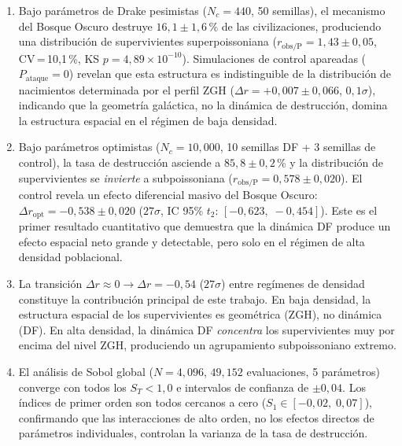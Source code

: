 \documentclass[11pt,a4paper,onecolumn]{article}
\begin{document}
\begin{enumerate}
  \item Bajo parámetros de Drake pesimistas ($N_c = 440$, 50 semillas),
        el mecanismo del Bosque Oscuro destruye $16{,}1 \pm 1{,}6$\,\%
        de las civilizaciones, produciendo una distribución de
        supervivientes superpoissoniana
        ($r_\text{obs/P} = 1{,}43 \pm 0{,}05$, CV\,=\,10{,}1\,\%,
        KS $p = 4{,}89\times10^{-10}$).
        Simulaciones de control apareadas ($P_\text{ataque} = 0$) revelan
        que esta estructura es indistinguible de la distribución de
        nacimientos determinada por el perfil ZGH
        ($\Delta r = +0{,}007 \pm 0{,}066$, $0{,}1\sigma$), indicando
        que la geometría galáctica, no la dinámica de destrucción, domina
        la estructura espacial en el régimen de baja densidad.

  \item Bajo parámetros optimistas ($N_c = 10{,}000$, 10 semillas DF +
        3 semillas de control), la tasa de destrucción asciende a
        $85{,}8 \pm 0{,}2$\,\% y la distribución de supervivientes se
        \emph{invierte} a subpoissoniana
        ($r_\text{obs/P} = 0{,}578 \pm 0{,}020$).
        El control revela un efecto diferencial masivo del Bosque Oscuro:
        $\Delta r_\text{opt} = -0{,}538 \pm 0{,}020$ ($27\sigma$,
        IC 95\% $t_2$: $[-0{,}623,\; -0{,}454]$).
        Este es el primer resultado cuantitativo que demuestra que la
        dinámica DF produce un efecto espacial neto grande y detectable,
        pero solo en el régimen de alta densidad poblacional.

  \item La transición $\Delta r \approx 0 \to \Delta r = -0{,}54$
        ($27\sigma$) entre regímenes de densidad constituye la
        contribución principal de este trabajo.
        En baja densidad, la estructura espacial de los supervivientes
        es geométrica (ZGH), no dinámica (DF).
        En alta densidad, la dinámica DF \emph{concentra} los
        supervivientes muy por encima del nivel ZGH, produciendo un
        agrupamiento subpoissoniano extremo.

  \item El análisis de Sobol global ($N = 4{,}096$, $49{,}152$
        evaluaciones, 5 parámetros) converge con todos los
        $S_T < 1{,}0$ e intervalos de confianza de $\pm 0{,}04$.
        Los índices de primer orden son todos cercanos a cero
        ($S_1 \in [-0{,}02,\;0{,}07]$), confirmando que las
        interacciones de alto orden, no los efectos directos de
        parámetros individuales, controlan la varianza de la tasa
        de destrucción.


\end{enumerate}
\end{document}

